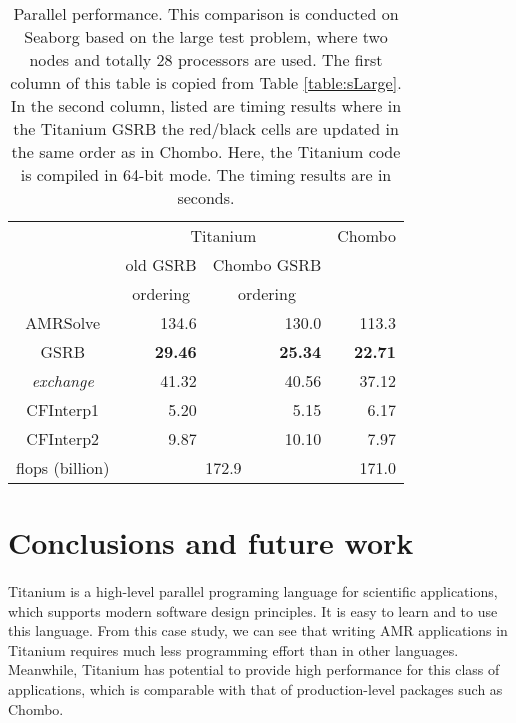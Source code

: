 \documentclass{ieee}
\numberwithin{equation}{section}
\begin{document}
\begin{table}
\begin{center}
{\small
\begin{tabular}{|c|r|r|r|}\hline
\  &\multicolumn{2}{|c|}{Titanium}  &Chombo  \\ \cline{2-3}
\             &old GSRB&Chombo GSRB&\ \\ 
\             &\multicolumn{1}{|c|}{ordering}&\multicolumn{1}{|c|}{ordering}&\ \\ \hline
AMRSolve      &134.6   &130.0  &113.3\\ \hline \hline
GSRB          &{\bf 29.46}   &{\bf 25.34}  &{\bf 22.71}\\ \hline
{\it exchange}&41.32   &40.56  &37.12\\ \hline 
CFInterp1     &5.20    &5.15   &6.17\\ \hline
CFInterp2     &9.87    &10.10  &7.97\\ \hline \hline
flops (billion)&\multicolumn{2}{|c|}{172.9}  &171.0 \\ \hline
\end{tabular}
}
\caption{Parallel performance. This comparison is conducted on Seaborg based on the large test problem, where two nodes and totally 28 processors  are used. The first column of this table is copied from Table \ref{table:sLarge}. In the second column, listed are timing results where in the Titanium GSRB the red/black cells are updated in the same order as in Chombo. Here, the Titanium code is compiled in 64-bit mode. The timing results are in seconds.}
\label{table:comparison28}
\end{center}
\end{table}

\section{Conclusions and future work}

\paragraph{}Titanium is a high-level parallel programing language for scientific applications, which supports  modern software design principles. It is easy to learn and to use this language. From this case study, we can see that writing AMR applications in Titanium requires much less programming effort than in other languages. Meanwhile, Titanium has potential to provide high performance for this class of applications, which is comparable with that of production-level packages such as Chombo. 
\end{document}

